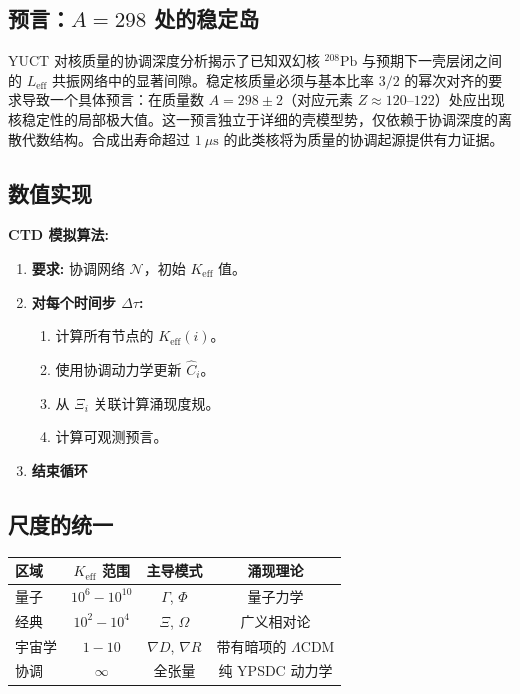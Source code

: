 \documentclass[11pt,a4paper]{article}
\begin{document}
	\subsection{预言：$A=298$ 处的稳定岛}
	
	YUCT 对核质量的协调深度分析揭示了已知双幻核 $^{208}\mathrm{Pb}$ 与预期下一壳层闭之间的 $L_{\mathrm{eff}}$ 共振网络中的显著间隙。稳定核质量必须与基本比率 $3/2$ 的幂次对齐的要求导致一个具体预言：在质量数 $A = 298 \pm 2$（对应元素 $Z \approx 120$--$122$）处应出现核稳定性的局部极大值。这一预言独立于详细的壳模型势，仅依赖于协调深度的离散代数结构。合成出寿命超过 $1\ \mu\text{s}$ 的此类核将为质量的协调起源提供有力证据。
	
	\subsection{数值实现}
	
	\textbf{CTD 模拟算法:}
	\begin{enumerate}
		\item \textbf{要求:} 协调网络 $\mathcal{N}$，初始 $K_{\mathrm{eff}}$ 值。
		\item \textbf{对每个时间步 $\Delta\tau$:}
		\begin{enumerate}
			\item 计算所有节点的 $K_{\mathrm{eff}}(i)$。
			\item 使用协调动力学更新 $\hat{C}_i$。
			\item 从 $\Xi_i$ 关联计算涌现度规。
			\item 计算可观测预言。
		\end{enumerate}
		\item \textbf{结束循环}
	\end{enumerate}
	
	\subsection{尺度的统一}
	
	\begin{table}[htbp]
		\centering
		\begin{tabular}{lccc}
			\toprule
			\textbf{区域} & \textbf{$K_{\mathrm{eff}}$ 范围} & \textbf{主导模式} & \textbf{涌现理论} \\
			\midrule
			量子 & $10^6-10^{10}$ & $\Gamma$, $\Phi$ & 量子力学 \\
			经典 & $10^2-10^4$ & $\Xi$, $\Omega$ & 广义相对论 \\
			宇宙学 & $1-10$ & $\nabla D$, $\nabla R$ & 带有暗项的 $\Lambda$CDM \\
			协调 & $\infty$ & 全张量 & 纯 YPSDC 动力学 \\
			\bottomrule
		\end{tabular}
	\end{table}
	
\end{document}
